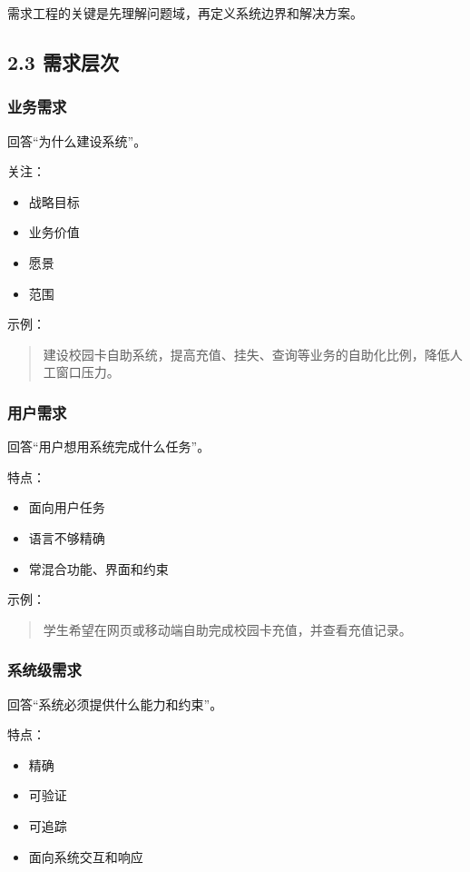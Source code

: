 \documentclass[UTF8,zihao=-4]{ctexart}
\begin{document}
需求工程的关键是先理解问题域，再定义系统边界和解决方案。

\subsection{2.3 需求层次}

\subsubsection{业务需求}

回答“为什么建设系统”。

关注：

\begin{itemize}
\item 战略目标
\item 业务价值
\item 愿景
\item 范围
\end{itemize}

示例：

\begin{quote}
建设校园卡自助系统，提高充值、挂失、查询等业务的自助化比例，降低人工窗口压力。
\end{quote}

\subsubsection{用户需求}

回答“用户想用系统完成什么任务”。

特点：

\begin{itemize}
\item 面向用户任务
\item 语言不够精确
\item 常混合功能、界面和约束
\end{itemize}

示例：

\begin{quote}
学生希望在网页或移动端自助完成校园卡充值，并查看充值记录。
\end{quote}

\subsubsection{系统级需求}

回答“系统必须提供什么能力和约束”。

特点：

\begin{itemize}
\item 精确
\item 可验证
\item 可追踪
\item 面向系统交互和响应
\end{itemize}
\end{document}
